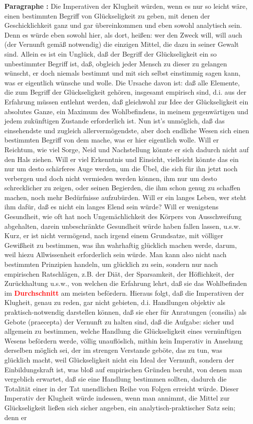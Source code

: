 \documentclass[a4paper,12pt,twoside]{book}
\newcommand{\match}[1]{\textcolor{red}{\textbf{#1}}}
\begin{document}
	\noindent\textbf{Paragraphe : }Die Imperativen der Klugheit würden, wenn es nur so leicht wäre, einen bestimmten Begriff von Glückseligkeit zu geben, mit denen der Geschicklichkeit ganz und gar übereinkommen und eben sowohl analytisch sein. Denn es würde eben sowohl hier, als dort, heißen: wer den Zweck will, will auch (der Vernunft gemäß notwendig) die einzigen Mittel, die dazu in seiner Gewalt sind. Allein es ist ein Unglück, daß der Begriff der Glückseligkeit ein so unbestimmter Begriff ist, daß, obgleich jeder Mensch zu dieser zu gelangen wünscht, er doch niemals bestimmt und mit sich selbst einstimmig sagen kann, was er eigentlich wünsche und wolle. Die Ursache davon ist: daß alle Elemente, die zum Begriff der Glückseligkeit gehören, insgesamt empirisch sind, d.i. aus der Erfahrung müssen entlehnt werden, daß gleichwohl zur Idee der Glückseligkeit ein absolutes Ganze, ein Maximum des Wohlbefindens, in meinem gegenwärtigen und jedem zukünftigen Zustande erforderlich ist. Nun ist's unmöglich, daß das einsehendste und zugleich allervermögendste, aber doch endliche Wesen sich einen bestimmten Begriff von dem mache, was er hier eigentlich wolle. Will er Reichtum, wie viel Sorge, Neid und Nachstellung könnte er sich dadurch nicht auf den Hals ziehen. Will er viel Erkenntnis und Einsicht, vielleicht könnte das ein nur um desto schärferes Auge werden, um die Übel, die sich für ihn jetzt noch verbergen und doch nicht vermieden werden können, ihm nur  um desto schrecklicher zu zeigen, oder seinen Begierden, die ihm schon genug zu schaffen machen, noch mehr Bedürfnisse aufzubürden. Will er ein langes Leben, wer steht ihm dafür, daß es nicht ein langes Elend sein würde? Will er wenigstens Gesundheit, wie oft hat noch Ungemächlichkeit des Körpers von Ausschweifung abgehalten, darein unbeschränkte Gesundheit würde haben fallen lassen, u.s.w. Kurz, er ist nicht vermögend, nach irgend einem Grundsatze, mit völliger Gewißheit zu bestimmen, was ihn wahrhaftig glücklich machen werde, darum, weil hiezu Allwissenheit erforderlich sein würde. Man kann also nicht nach bestimmten Prinzipien handeln, um glücklich zu sein, sondern nur nach empirischen Ratschlägen, z.B. der Diät, der Sparsamkeit, der Höflichkeit, der Zurückhaltung u.s.w., von welchen die Erfahrung lehrt, daß sie das Wohlbefinden im \match{Durchschnitt} am meisten befördern. Hieraus folgt, daß die Imperativen der Klugheit, genau zu reden, gar nicht gebieten, d.i. Handlungen objektiv als praktisch-notwendig darstellen können, daß sie eher für Anratungen (consilia) als Gebote (praecepta) der Vernunft zu halten sind, daß die Aufgabe: sicher und allgemein zu bestimmen, welche Handlung die Glückseligkeit eines vernünftigen Wesens befördern werde, völlig unauflöslich, mithin kein Imperativ in Ansehung derselben möglich sei, der im strengen Verstande geböte, das zu tun, was glücklich macht, weil Glückseligkeit nicht ein Ideal der Vernunft, sondern der Einbildungskraft ist, was bloß auf empirischen Gründen beruht, von denen man vergeblich erwartet, daß sie eine Handlung bestimmen sollten, dadurch die Totalität einer in der Tat unendlichen Reihe von Folgen erreicht würde. Dieser Imperativ der Klugheit würde indessen, wenn man annimmt, die Mittel zur Glückseligkeit ließen sich sicher angeben, ein analytisch-praktischer Satz sein; denn er 
\end{document}

